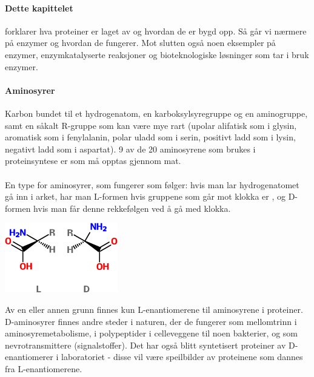 
\paragraph{Dette kapittelet} forklarer hva proteiner er laget av og hvordan de er bygd opp. Så går vi nærmere på enzymer og hvordan de fungerer. Mot slutten også noen eksempler på enzymer, enzymkatalyserte reaksjoner og bioteknologiske løsninger som tar i bruk enzymer.

 

\paragraph{Aminosyrer} Karbon bundet til et hydrogenatom, en karboksylsyregruppe og en aminogruppe, samt en såkalt R-gruppe som kan være mye rart (upolar alifatisk som i glysin, aromatisk som i fenylalanin, polar uladd som i serin, positivt ladd som i lysin, negativt ladd som i aspartat). 9 av de 20 aminosyrene som brukes i proteinsyntese er  som må opptas gjennom mat. 

\paragraph{} En type  for aminosyrer, som fungerer som følger: hvis man lar hydrogenatomet gå inn i arket, har man L-formen hvis gruppene som går mot klokka er , og D-formen hvis man får denne rekkefølgen ved å gå med klokka.
\begin{center}
	\includegraphics[scale=0.5]{enantiomers.png}
\end{center}
Av en eller annen grunn finnes kun L-enantiomerene til aminosyrene i proteiner. D-aminosyrer finnes andre steder i naturen, der de fungerer som mellomtrinn i aminosyremetabolisme, i polypeptider i celleveggene til noen bakterier, og som nevrotransmittere (signalstoffer). Det har også blitt syntetisert proteiner av D-enantiomerer i laboratoriet - disse vil være speilbilder av proteinene som dannes fra L-enantiomerene.

